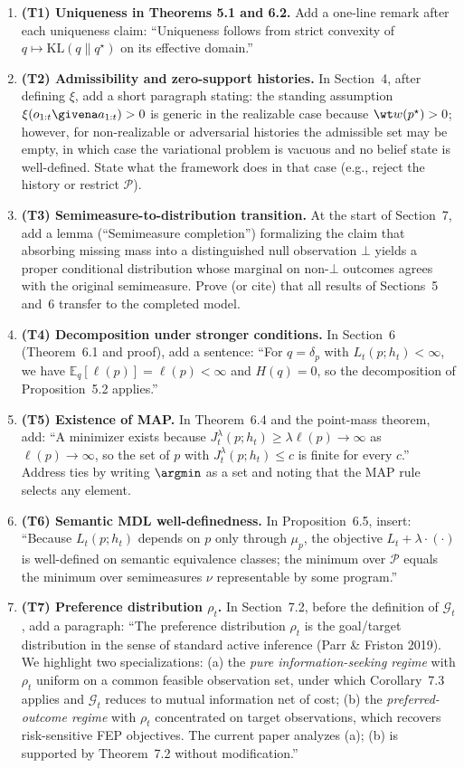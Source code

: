 \documentclass[11pt]{article}
\begin{document}
\begin{enumerate}[leftmargin=*]
\item \textbf{(T1) Uniqueness in Theorems 5.1 and 6.2.} Add a one-line remark after each uniqueness claim: ``Uniqueness follows from strict convexity of $q \mapsto \mathrm{KL}(q\|q^\star)$ on its effective domain.''
\item \textbf{(T2) Admissibility and zero-support histories.} In Section~4, after defining $\xi$, add a short paragraph stating: the standing assumption $\xi(o_{1:t}\givena a_{1:t}) > 0$ is generic in the realizable case because $\wt w(p^\star) > 0$; however, for non-realizable or adversarial histories the admissible set may be empty, in which case the variational problem is vacuous and no belief state is well-defined. State what the framework does in that case (e.g., reject the history or restrict $\mathcal{P}$).
\item \textbf{(T3) Semimeasure-to-distribution transition.} At the start of Section~7, add a lemma (``Semimeasure completion'') formalizing the claim that absorbing missing mass into a distinguished null observation $\bot$ yields a proper conditional distribution whose marginal on non-$\bot$ outcomes agrees with the original semimeasure. Prove (or cite) that all results of Sections~5 and~6 transfer to the completed model.
\item \textbf{(T4) Decomposition under stronger conditions.} In Section~6 (Theorem~6.1 and proof), add a sentence: ``For $q = \delta_p$ with $L_t(p;h_t)<\infty$, we have $\mathbb{E}_q[\ell(p)] = \ell(p) < \infty$ and $H(q) = 0$, so the decomposition of Proposition~5.2 applies.''
\item \textbf{(T5) Existence of MAP.} In Theorem~6.4 and the point-mass theorem, add: ``A minimizer exists because $J_t^\lambda(p;h_t) \ge \lambda \ell(p) \to \infty$ as $\ell(p) \to \infty$, so the set of $p$ with $J_t^\lambda(p;h_t) \le c$ is finite for every $c$.'' Address ties by writing $\argmin$ as a set and noting that the MAP rule selects any element.
\item \textbf{(T6) Semantic MDL well-definedness.} In Proposition~6.5, insert: ``Because $L_t(p;h_t)$ depends on $p$ only through $\mu_p$, the objective $L_t + \lambda\cdot(\cdot)$ is well-defined on semantic equivalence classes; the minimum over $\mathcal{P}$ equals the minimum over semimeasures $\nu$ representable by some program.''
\item \textbf{(T7) Preference distribution $\rho_t$.} In Section~7.2, before the definition of $\mathcal{G}_t$, add a paragraph: ``The preference distribution $\rho_t$ is the goal/target distribution in the sense of standard active inference (Parr \& Friston 2019). We highlight two specializations: (a) the \emph{pure information-seeking regime} with $\rho_t$ uniform on a common feasible observation set, under which Corollary~7.3 applies and $\mathcal{G}_t$ reduces to mutual information net of cost; (b) the \emph{preferred-outcome regime} with $\rho_t$ concentrated on target observations, which recovers risk-sensitive FEP objectives. The current paper analyzes (a); (b) is supported by Theorem~7.2 without modification.''

\end{enumerate}
\end{document}
